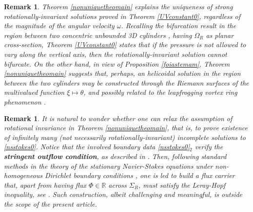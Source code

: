 \documentclass[a4paper,11pt]{article}
\newtheorem{remark}[theorem]{Remark}
\numberwithin{equation}{section}
\numberwithin{figure}{section}
\begin{document}
\begin{remark}
Theorem \ref{nonuniquetheomain} explains the uniqueness of strong rotationally-invariant solutions proved in Theorem \ref{UVconstant0},
regardless of the magnitude of the angular velocity $\omega$. Recalling the bifurcation result in the region between two concentric
unbounded 3D cylinders \cite{velte1966stabilitat}, having $\Omega_R$ as planar cross-section, Theorem \ref{UVconstant0} states that if the pressure
is not allowed to vary along the vertical axis, then the rotationally-invariant solution cannot bifurcate. On the other hand, in view of Proposition
\ref{foiastemam}, Theorem \ref{nonuniquetheomain} suggests that, perhaps, an {\em helicoidal} solution in the region between the two cylinders
may be constructed through the Riemann surfaces of the multivalued function $\xi \mapsto \theta$, and possibly related to the leapfrogging vortex ring phenomenon \cite{davila2024leapfrogging}.
\end{remark}

\begin{remark}
It is natural to wonder whether one can relax the assumption of rotational invariance in Theorem \ref{nonuniquetheomain}, that is, to prove existence of infinitely many (not necessarily rotationally-invariant) incomplete solutions to \eqref{nsstokes0}. Notice that the involved boundary data \eqref{nsstokes0}$_2$ verify the \textbf{stringent outflow condition}, as described in \cite[Section 3.3.1]{korobkov2024steady}. Then, following standard methods in the theory of the stationary Navier-Stokes equations under non-homogeneous Dirichlet boundary conditions \cite[Chapter 5, Section 2]{ladyzhenskaya1969mathematical}, one is led to build a flux carrier that, apart from having flux $\Phi \in \mathbb{R}$ across $\Sigma_{R}$, must satisfy the Leray-Hopf inequality, see \cite[Lemma 3.3.1]{korobkov2024steady}. Such construction, albeit challenging and meaningful, is outside the scope of the present article.
\end{remark}
\end{document}
